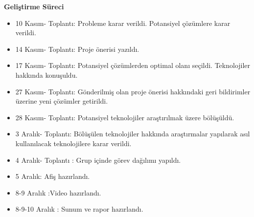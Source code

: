 \documentclass[12pt,a4paper]{report}
\begin{document}
\newpage
{\large\bfseries Geliştirme Süreci\\ \par}
\begin{itemize}
	\item 10 Kasım- Toplantı: Probleme karar verildi. Potansiyel çözümlere karar verildi. 
	
	\item 14 Kasım- Toplantı: Proje önerisi yazıldı.
	
	\item 17 Kasım- Toplantı: Potansiyel çözümlerden optimal olanı seçildi. Teknolojiler hakkında konuşuldu. 
	
	\item 27 Kasım- Toplantı: Gönderilmiş olan proje önerisi hakkındaki geri bildirimler üzerine yeni çözümler getirildi.
	
	\item 28 Kasım- Toplantı: Potansiyel teknolojiler araştırılmak üzere bölüşüldü.
	
	\item 3 Aralık- Toplantı: Bölüşülen teknolojiler hakkında araştırmalar yapılarak asıl kullanılacak teknolojilere karar verildi. 
	
	\item 4 Aralık- Toplantı : Grup içinde görev dağılımı yapıldı.
	
	\item 5 Aralık: Afiş hazırlandı.
	
	\item 8-9 Aralık :Video hazırlandı.
	
	\item 8-9-10 Aralık : Sunum ve rapor hazırlandı.
\end{itemize}

\newpage
\end{document}
